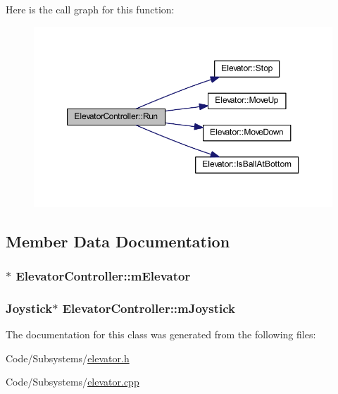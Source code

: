 \-Here is the call graph for this function\-:\nopagebreak
\begin{figure}[H]
\begin{center}
\leavevmode
\includegraphics[width=350pt]{class_elevator_controller_acb23b14310035e5d005236c1f96a3a9c_cgraph}
\end{center}
\end{figure}




\subsection{\-Member \-Data \-Documentation}
\hypertarget{class_elevator_controller_a9ccaa26570f171bb40da0837d755a190}{
\subsubsection[{m\-Elevator}]{$\ast$ {\bf \-Elevator\-Controller\-::m\-Elevator}}}\label{class_elevator_controller_a9ccaa26570f171bb40da0837d755a190}
\hypertarget{class_elevator_controller_a5c46184e464b02e9a2809a20a55722aa}{
\subsubsection[{m\-Joystick}]{\setlength{\rightskip}{0pt plus 5cm}\-Joystick$\ast$ {\bf \-Elevator\-Controller\-::m\-Joystick}}}\label{class_elevator_controller_a5c46184e464b02e9a2809a20a55722aa}


\-The documentation for this class was generated from the following files\-:\begin{DoxyCompactItemize}
\item 
\-Code/\-Subsystems/\hyperlink{elevator_8h}{elevator.\-h}\item 
\-Code/\-Subsystems/\hyperlink{elevator_8cpp}{elevator.\-cpp}\end{DoxyCompactItemize}

